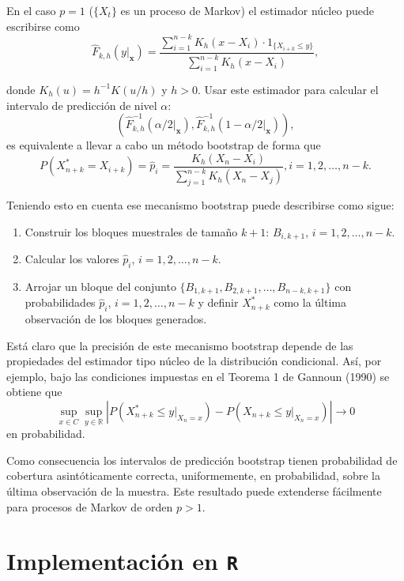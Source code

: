 \documentclass[
]{book}
\theoremstyle{break}
\theoremstyle{definition}
\theoremstyle{definition}
\theoremstyle{definition}
\theoremstyle{definition}
\theoremstyle{remark}
\begin{document}
En el caso \(p=1\) (\(\{X_{t}\}\) es un proceso de Markov) el estimador
núcleo puede escribirse como
\[\widehat{F}_{k,h}(y|_{\mathbf{x}})=\frac{\sum_{i=1}^{n-k}K_{h}(x-X_i)\cdot
1_{\{X_{i+k}\leq y\}}}{\sum_{i=1}^{n-k}K_{h}(x-X_i)},\]

donde \(K_{h}(u)=h^{-1}K(u/h)\) y \(h>0\). Usar este estimador para calcular
el intervalo de predicción de nivel \(\alpha\):
\[\left( \widehat{F}
_{k,h}^{-1}(\alpha /2|_{\mathbf{x}}),\widehat{F}_{k,h}^{-1}(1-\alpha /2|_{\mathbf{x}}) \right),\]
es equivalente a llevar a cabo un método bootstrap de forma que
\[P\left( X_{n+k}^{\ast}=X_{i+k} \right) =\widehat{p}_i=\frac{
K_{h}(X_n-X_i)}{\sum_{j=1}^{n-k}K_{h}(X_n-X_j)}\mathrm{,}
i=1,2,\ldots ,n-k.\]

Teniendo esto en cuenta ese mecanismo bootstrap puede describirse como
sigue:

\begin{enumerate}
\def\labelenumi{\arabic{enumi}.}
\item
  Construir los bloques muestrales de tamaño \(k+1\): \(B_{i,k+1}\),
  \(i=1,2,\ldots ,n-k\).
\item
  Calcular los valores \(\widehat{p}_i\), \(i=1,2,\ldots ,n-k\).
\item
  Arrojar un bloque del conjunto \(\{B_{1,k+1},B_{2,k+1},\ldots ,B_{n-k,k+1}\}\) con probabilidades \(\widehat{p}_i\),
  \(i=1,2,\ldots ,n-k\) y definir \(X_{n+k}^{\ast}\) como la última
  observación de los bloques generados.
\end{enumerate}

Está claro que la precisión de este mecanismo bootstrap depende de las
propiedades del estimador tipo núcleo de la distribución condicional.
Así, por ejemplo, bajo las condiciones impuestas en el Teorema 1 de
Gannoun (1990) se obtiene que
\[\sup_{x\in C}\sup_{y\in \mathbb{R}}\left\vert P\left( X_{n+k}^{\ast}\leq
y|_{X_n=x} \right) -P\left( X_{n+k}\leq y|_{X_n=x} \right) \right\vert
\rightarrow 0\]
en probabilidad.

Como consecuencia los intervalos de predicción bootstrap tienen
probabilidad de cobertura asintóticamente correcta, uniformemente, en
probabilidad, sobre la última observación de la muestra. Este resultado
puede extenderse fácilmente para procesos de Markov de orden
\(p>1\).

\hypertarget{implementaciuxf3n-en-r}{%
\section{\texorpdfstring{Implementación en \texttt{R}}{Implementación en R}}\label{implementaciuxf3n-en-r}}
\end{document}

